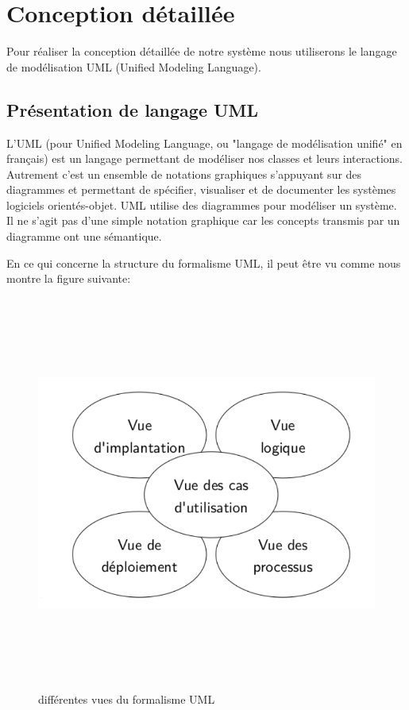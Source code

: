		
	
	\section{Conception détaillée}
		Pour réaliser la conception détaillée de notre système nous utiliserons le langage de modélisation UML (Unified Modeling Language).
		\subsection{Présentation de langage UML}
			L'UML (pour Unified Modeling Language, ou "langage de modélisation unifié" en français) est un langage permettant de modéliser nos classes et leurs interactions. Autrement c’est un ensemble de notations graphiques s’appuyant sur des diagrammes et permettant de spécifier, visualiser et de documenter les systèmes logiciels orientés-objet. UML utilise des diagrammes pour modéliser un système. Il ne s’agit pas d’une simple notation graphique car les concepts transmis par un diagramme ont une sémantique\cite{SMSSEC}.

	En ce qui concerne la structure du formalisme UML, il peut être vu comme nous montre la figure suivante:
			\begin{figure}[H]
					\centering		
					\includegraphics[width=18cm, height=13cm]{../imgs/uml.png} 				
					\caption{différentes vues du formalisme UML }
					\label{vueuml}
			\end{figure}
			
